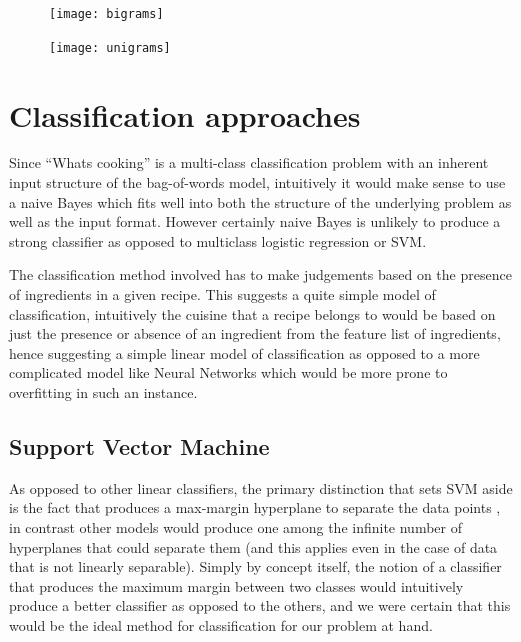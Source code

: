 \documentclass[prodmode,acmtap]{acmlarge}
\begin{document}
\begin{figure}
\centering
\begin{minipage}{.45\textwidth}
  \centering
  \texttt{[image: bigrams]}
  \label{bigrams}
\end{minipage}%
\hfill
\begin{minipage}{.45\textwidth}
  \centering
  \texttt{[image: unigrams]}
  \label{unigrams}
\end{minipage}
\end{figure}





\section{Classification approaches}
Since ``What\textquotesingle s cooking'' is a multi-class classification problem with an inherent input structure of the bag-of-words model, intuitively it would make sense to use a naive Bayes which fits well into both the structure of the underlying problem as well as the input format. However certainly naive Bayes is unlikely to produce a strong classifier as opposed to multiclass logistic regression or SVM.

The classification method involved has to make judgements based on the presence of ingredients in a given recipe. This suggests a quite simple model of classification, intuitively the cuisine that a recipe belongs to would be based on just the presence or absence of an ingredient from the feature list of ingredients, hence suggesting a simple linear model of classification as opposed to a more complicated model like Neural Networks which would be more prone to overfitting in such an instance. 

\subsection{Support Vector Machine}

As opposed to other linear classifiers, the primary distinction that sets SVM aside is the fact that 
produces a max-margin hyperplane to separate the data points , in contrast other models would produce one among the infinite number of hyperplanes that could separate them (and this applies even in the case of data that is not linearly separable). Simply by concept itself, the notion of a classifier that produces the maximum margin between two classes would intuitively produce a better classifier as opposed to the others, and we were certain that this would be the ideal method for classification for our problem at hand.
\end{document}

